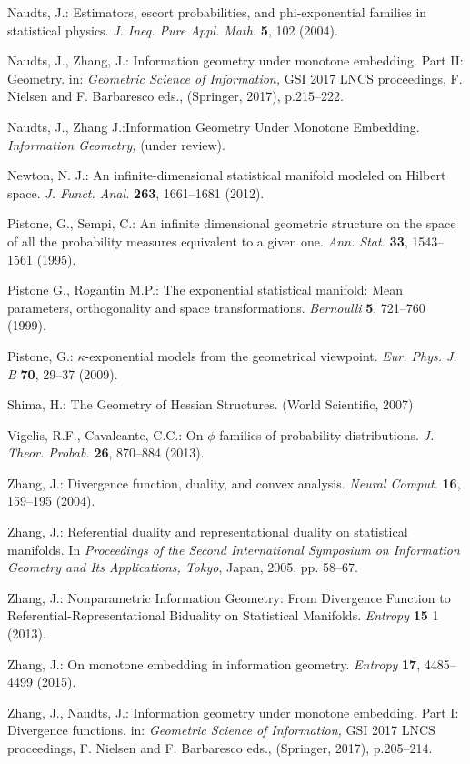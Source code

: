 \documentclass[graybox]{svmult}
\newcommand{\add}[1]{{\color{blue}#1}}
\begin{document}
\begin{thebibliography}{99}
Naudts, J.:
Estimators, escort probabilities, and phi-exponential families in statistical physics.
{\em J. Ineq. Pure Appl. Math.} {\bf 5}, 102 (2004).

Naudts, J., Zhang, J.: Information geometry under monotone embedding. Part II: Geometry.
in: {\em Geometric Science of Information,}
GSI 2017 LNCS proceedings,
F. Nielsen and F. Barbaresco eds., (Springer, 2017), p.215--222.

Naudts, J., Zhang J.:Information Geometry Under Monotone Embedding.
{\em Information Geometry,} (under review). 

Newton, N. J.:
An infinite-dimensional statistical manifold modeled on Hilbert space.
{\em J. Funct. Anal.} {\bf 263}, 1661--1681 (2012).


Pistone, G., Sempi, C.: An infinite dimensional geometric structure on the space 
of all the probability measures equivalent to a given one. {\em Ann. Stat.} {\bf 33}, 1543--1561 (1995).

Pistone G., Rogantin M.P.: The exponential statistical manifold: Mean parameters, 
orthogonality and space transformations. {\em Bernoulli} {\bf 5}, 
721--760 (1999).

Pistone, G.: $\kappa$-exponential models from the geometrical viewpoint. 
{\em Eur. Phys. J. B} {\bf 70}, 29--37 (2009).

\add{
Shima, H.: The Geometry of Hessian Structures.
(World Scientific, 2007)
}

Vigelis, R.F., Cavalcante, C.C.:
On $\phi$-families of probability distributions.
{\em J. Theor. Probab.} {\bf 26}, 870--884 (2013).

Zhang, J.: Divergence function, duality, and convex analysis. {\em Neural 
Comput.} {\bf 16}, 159--195 (2004).

Zhang, J.:
Referential duality and representational duality on statistical manifolds.
In {\it Proceedings of the Second International Symposium on Information Geometry and Its Applications, Tokyo},
Japan, 2005, pp. 58--67.

Zhang, J.: Nonparametric Information Geometry: From Divergence
Function to Referential-Representational Biduality on
Statistical Manifolds.
{\em Entropy} {\bf 15} 1 (2013).

Zhang, J.: On monotone embedding in information geometry.
{\em Entropy}  {\bf 17}, 4485--4499 (2015).

Zhang, J., Naudts, J.: Information geometry under monotone embedding. Part I: Divergence functions.
in: {\em Geometric Science of Information,}
GSI 2017 LNCS proceedings,
F. Nielsen and F. Barbaresco eds., (Springer, 2017), p.205--214. 


\end{thebibliography}
\end{document}

